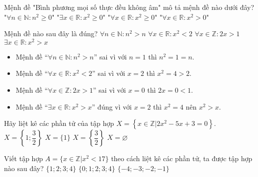 \begin{ex}%
	Mệnh đề "Bình phương mọi số thực đều không âm" mô tả mệnh đề nào dưới đây?
	\choice
	{"$\forall n\in\mathbb{N}: n^2\geq 0$"}
	{"$\exists x\in\mathbb{R}:x^2\geq 0$"}
	{\True "$\forall x\in\mathbb{R}: x^2\geq 0$"}
	{"$\forall x\in\mathbb{R}:x^2>0$"}
\end{ex}
\begin{ex}%
	Mệnh đề nào sau đây là đúng?
	\choice
	{$\forall n\in\mathbb{N}\colon n^2>n$}
	{$\forall x\in\mathbb{R}\colon x^2<2$}
	{$\forall x\in\mathbb{Z}\colon 2x>1$}
	{\True $\exists x\in\mathbb{R}\colon x^2>x$}
	\loigiai
	{
		\begin{itemize}
			\item Mệnh đề ``$\forall n\in\mathbb{N}\colon n^2>n$'' sai vì với $n=1$ thì $n^2=1=n$.
			\item Mệnh đề ``$\forall x\in\mathbb{R}\colon x^2<2$'' sai vì với $x=2$ thì $x^2=4>2$.
			\item Mệnh đề ``$\forall x\in\mathbb{Z}\colon 2x>1$'' sai vì với $x=0$ thì $2x=0<1$.
			\item Mệnh đề ``$\exists x\in\mathbb{R}\colon x^2>x$'' đúng vì với $x=2$ thì $x^2=4$ nên $x^2>x$.
		\end{itemize}
	}
\end{ex}
\begin{ex}%
	Hãy liệt kê các phần tử của tập hợp $X = \left\{ x \in \mathbb{Z} | 2x^2-5x+3=0 \right\}$.
	\choice
	{$X = \left\{1;\dfrac{3}{2} \right\}$}
	{\True $X = \{ 1 \}$}
	{$X = \left\{ \dfrac{3}{2} \right\}$}
	{$X = \varnothing$}
\end{ex}
\begin{ex}%
	Viết tập hợp $A=\lbrace x \in \mathbb{Z}|x^2<17 \rbrace $ theo cách liệt kê các phần tử, ta được tập hợp nào sau đây?
	{$ \lbrace 1;2;3;4 \rbrace $}
	{$\lbrace 0;1;2;3;4  \rbrace $}
	{$ \lbrace -4; -3;-2;-1 \rbrace $}
\end{ex}

